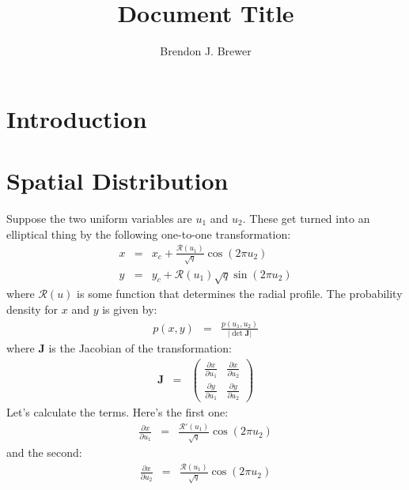 \documentclass[letterpaper, 11pt]{article}
\title{Document Title}
\author{Brendon J. Brewer}
\begin{document}
\maketitle

\section{Introduction}

\section{Spatial Distribution}
Suppose the two uniform variables are $u_1$ and $u_2$.
These get turned into an elliptical thing by the following
one-to-one transformation:
\begin{eqnarray}
x &=& x_c + \frac{\mathcal{R}(u_1)}{\sqrt{q}}\cos\left(2\pi u_2\right)\\
y &=& y_c + \mathcal{R}(u_1)\sqrt{q}\sin\left(2\pi u_2\right)
\end{eqnarray}
where $\mathcal{R}(u)$ is some function that determines the
radial profile. The probability density for $x$ and $y$ is given by:
\begin{eqnarray}
p(x, y)
&=& \frac{p(u_1, u_2)}{\left|\det \mathbf{J}\right|}
\end{eqnarray}
where $\mathbf{J}$ is the Jacobian of the transformation:
\begin{eqnarray}
\mathbf{J} &=&
\left(
\begin{array}{cc}
\frac{\partial x}{\partial u_1} & \frac{\partial x}{\partial u_2}\\
\frac{\partial y}{\partial u_1} & \frac{\partial y}{\partial u_2}
\end{array}
\right)
\end{eqnarray}
Let's calculate the terms. Here's the first one:
\begin{eqnarray}
\frac{\partial x}{\partial u_1} &=& \frac{\mathcal{R}'(u_1)}{\sqrt{q}}\cos\left(2\pi u_2\right)
\end{eqnarray}
and the second:
\begin{eqnarray}
\frac{\partial x}{\partial u_2} &=& \frac{\mathcal{R}(u_1)}{\sqrt{q}}\cos\left(2\pi u_2\right)
\end{eqnarray}
\end{document}
